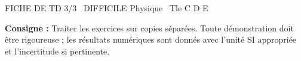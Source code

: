 \documentclass[11pt]{article}
\begin{document}
\begin{tcolorbox}[enhanced,colback=popink,colframe=popink,arc=10pt,boxrule=0pt,left=12pt,right=12pt,top=9pt,bottom=9pt]
{\color{white}\popxbold\small FICHE DE TD 3/3 \textbullet\ DIFFICILE \hfill Physique \textbullet\ Tle C D E\par}
\end{tcolorbox}
\vspace{4pt}
\noindent\textbf{Consigne :} Traiter les exercices sur copies séparées. Toute démonstration doit être rigoureuse ; les résultats numériques sont donnés avec l'unité SI appropriée et l'incertitude si pertinente.
\end{document}
